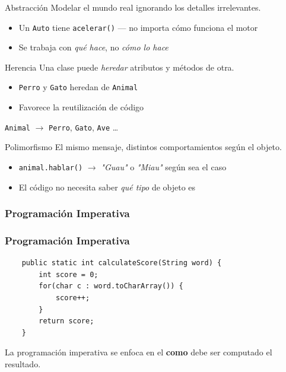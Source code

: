 \documentclass{beamer}
\begin{document}
\begin{frame}{Abstracción}
    Modelar el mundo real ignorando los detalles irrelevantes.
    \begin{itemize}
        \item Un \texttt{Auto} tiene \texttt{acelerar()} — no importa cómo funciona el motor
        \item Se trabaja con \textit{qué hace}, no \textit{cómo lo hace}
    \end{itemize}
\end{frame}

\begin{frame}{Herencia}
    Una clase puede \textit{heredar} atributos y métodos de otra.
    \begin{itemize}
        \item \texttt{Perro} y \texttt{Gato} heredan de \texttt{Animal}
        \item Favorece la reutilización de código
    \end{itemize}
    \vspace{0.5em}
    \texttt{Animal} $\rightarrow$ \texttt{Perro}, \texttt{Gato}, \texttt{Ave} \ldots
\end{frame}

\begin{frame}{Polimorfismo}
    El mismo mensaje, distintos comportamientos según el objeto.
    \begin{itemize}
        \item \texttt{animal.hablar()} $\rightarrow$ \textit{"Guau"} o \textit{"Miau"} según sea el caso
        \item El código no necesita saber \textit{qué tipo} de objeto es
    \end{itemize}
\end{frame}
\subsubsection{Programación Imperativa}
\begin{frame}[fragile]
    \frametitle{Programación Imperativa }

    \begin{lstlisting}
    public static int calculateScore(String word) {
        int score = 0;
        for(char c : word.toCharArray()) {
            score++;
        }
        return score;
    }
    \end{lstlisting}
    \vspace{0.5cm}
    \small
    La programación imperativa se enfoca en el \textbf{como} debe ser computado el resultado.

\end{frame}
\end{document}
